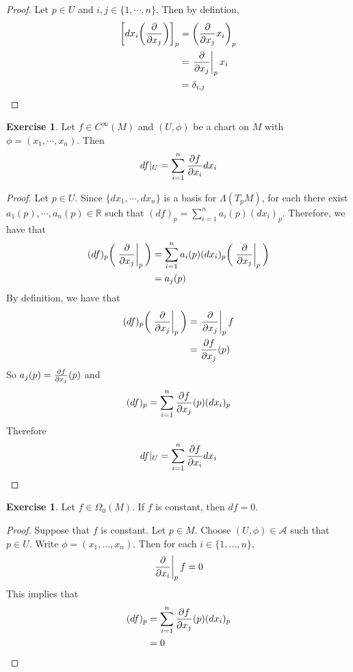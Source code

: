 \documentclass[12pt]{amsart}
\theoremstyle{definition}
\theoremstyle{definition}
\newtheorem{ex}[definition]{Exercise}
\newcommand{\del}{\delta}
\newcommand{\Lam}{\Lambda}
\newcommand{\Om}{\Omega}
\newcommand{\R}{\mathbb{R}}
\newcommand{\MA}{\mathcal{A}}
\begin{document}
	\begin{proof}
		Let $p \in U$ and $i,j \in \{1, \cdots, n\}$. Then  by defintion,
		\begin{align*}
			\bigg[ dx_i \bigg (\pdv{x_j} \bigg ) \bigg]_p 
			&= \bigg( \pdv{x_j} x_i \bigg )_p \\
			&= \eval{\pdv{x_j}}_{p} x_i \\
			&= \del_{i,j} \\
		\end{align*}
	\end{proof}

	\begin{ex}
		Let $f \in C^{\infty}(M)$ and $(U, \phi)$ be a chart on $M$ with $\phi = (x_1, \cdots, x_n)$. Then $$df|_U = \sum_{i=1}^n \pdv{f}{x_i} dx_i$$
	\end{ex}

	\begin{proof}
		Let $p \in U$. Since $\{dx_1, \cdots, dx_n\}$ is a basis for $\Lam(T_pM)$, for each there exist $a_1(p), \cdots, a_n(p) \in \R$ such that $(df)_p = \sum\limits_{i=1}^n a_i(p)(dx_i)_p$. Therefore, we have that 
		\begin{align*}
			(df)_p \bigg(\eval{\pdv{x_j}}_{p} \bigg) 
			&= \sum\limits_{i=1}^n a_i(p)(dx_i)_p \bigg(\eval{\pdv{x_j}}_{p} \bigg)  \\
			&=  a_j(p)
		\end{align*}
		By definition, we have that 
		\begin{align*}
			(df)_p\bigg(\eval{\pdv{x_j}}_{p} \bigg) 
			&= \eval{\pdv{x_j}}_{p} f \\ 
			&= {\pdv{f}{x_j}}(p)\\
		\end{align*}
		So $a_j(p) = {\pdv{f}{x_j}}(p)$ and $$(df)_p = \sum\limits_{i=1}^n {\pdv{f}{x_j}}(p)(dx_i)_p$$
		Therefore $$df|_U = \sum\limits_{i=1}^n {\pdv{f}{x_i}}dx_i$$
	\end{proof}
	
	\begin{ex}
	Let $f \in \Om_0(M)$. If $f$ is constant, then $df = 0$. 
	\end{ex}
	
	\begin{proof}
	Suppose that $f$ is constant. Let $p \in M$. Choose $(U, \phi) \in \MA$ such that $p \in U$. Write $\phi = (x_1, \dots, x_n)$. Then for each $i \in \{1, \dots, n\}$, $$\eval{\pdv{x_i}}_p f = 0$$ This implies that 
	\begin{align*}
	(df)_p 
	&= \sum\limits_{i=1}^n {\pdv{f}{x_j}}(p)(dx_i)_p \\
	&= 0
	\end{align*}
	\end{proof}
	
\end{document}
